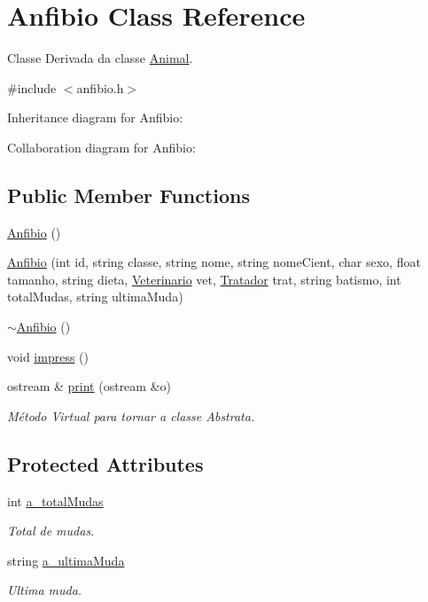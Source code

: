 \hypertarget{classAnfibio}{}\section{Anfibio Class Reference}
\label{classAnfibio}


Classe Derivada da classe \hyperlink{classAnimal}{Animal}.  




{\ttfamily \#include $<$anfibio.\+h$>$}



Inheritance diagram for Anfibio\+:


Collaboration diagram for Anfibio\+:
\subsection*{Public Member Functions}
\begin{DoxyCompactItemize}
\item 
\hyperlink{classAnfibio_a91fd9b91b9124ab41ea9e9c9bb013476}{Anfibio} ()
\item 
\hyperlink{classAnfibio_a1de0b802b933de9ac9b862cf46f7a3c3}{Anfibio} (int id, string classe, string nome, string nome\+Cient, char sexo, float tamanho, string dieta, \hyperlink{classVeterinario}{Veterinario} vet, \hyperlink{classTratador}{Tratador} trat, string batismo, int total\+Mudas, string ultima\+Muda)
\item 
\hyperlink{classAnfibio_a53bb71a1ed0e79c5fc41a62a0af9060c}{$\sim$\+Anfibio} ()
\item 
void \hyperlink{classAnfibio_a1905981100749f4cab706d3f6f4ded82}{impress} ()
\item 
ostream \& \hyperlink{classAnfibio_a8f2d675d174f4459e400f33de703467a}{print} (ostream \&o)
\begin{DoxyCompactList}\small\item\em Método Virtual para tornar a classe Abstrata. \end{DoxyCompactList}\end{DoxyCompactItemize}
\subsection*{Protected Attributes}
\begin{DoxyCompactItemize}
\item 
int \hyperlink{classAnfibio_a322af56e1ff61753e6abfe2693d29504}{a\+\_\+total\+Mudas}
\begin{DoxyCompactList}\small\item\em Total de mudas. \end{DoxyCompactList}\item 
string \hyperlink{classAnfibio_a674f19d430b4781216fac1fee2567771}{a\+\_\+ultima\+Muda}
\begin{DoxyCompactList}\small\item\em Ultima muda. \end{DoxyCompactList}\end{DoxyCompactItemize}


